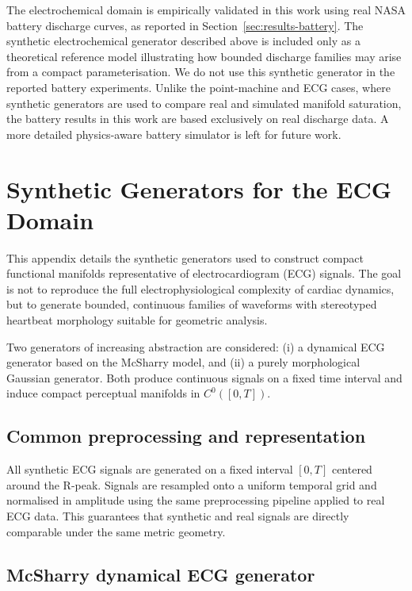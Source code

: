 \documentclass[10pt]{article}
\theoremstyle{plain}
\theoremstyle{definition}
\theoremstyle{remark}
\begin{document}
The electrochemical domain is empirically validated in this work using real
NASA battery discharge curves, as reported in Section~\ref{sec:results-battery}. The synthetic
electrochemical generator described above is included only as a theoretical
reference model illustrating how bounded discharge families may arise from a
compact parameterisation.
We do not use this synthetic generator in the reported battery experiments.
Unlike the point-machine and ECG cases, where synthetic generators are used to
compare real and simulated manifold saturation, the battery results in this work
are based exclusively on real discharge data. A more detailed physics-aware
battery simulator is left for future work.


\section{Synthetic Generators for the ECG Domain}
\label{app:gen_ecg}

This appendix details the synthetic generators used to construct compact
functional manifolds representative of electrocardiogram (ECG) signals.
The goal is not to reproduce the full electrophysiological complexity of
cardiac dynamics, but to generate bounded, continuous families of waveforms
with stereotyped heartbeat morphology suitable for geometric analysis.

Two generators of increasing abstraction are considered:
(i) a dynamical ECG generator based on the McSharry model, and
(ii) a purely morphological Gaussian generator.
Both produce continuous signals on a fixed time interval and induce compact
perceptual manifolds in $C^0([0,T])$.

\subsection{Common preprocessing and representation}

All synthetic ECG signals are generated on a fixed interval $[0,T]$ centered
around the R-peak. Signals are resampled onto a uniform temporal grid and
normalised in amplitude using the same preprocessing pipeline applied to real
ECG data. This guarantees that synthetic and real signals are directly
comparable under the same metric geometry.

\subsection{McSharry dynamical ECG generator}
\end{document}
